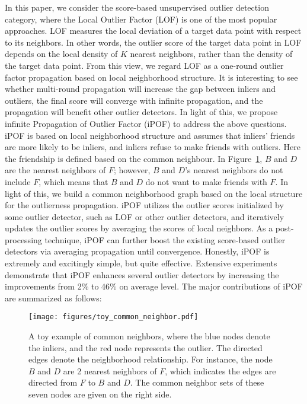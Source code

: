 \documentclass[sigconf,nonacm]{acmart}
\begin{document}
In this paper, we consider the score-based unsupervised outlier detection category, where the Local Outlier Factor (LOF) is one of the most popular approaches. LOF measures the local deviation of a target data point with respect to its neighbors. In other words, the outlier score of the target data point in LOF depends on the local density of $K$ nearest neighbors, rather than the density of the target data point. From this view, we regard LOF as a one-round outlier factor propagation based on local neighborhood structure. It is interesting to see whether multi-round propagation will increase the gap between inliers and outliers, the final score will converge with infinite propagation, and the propagation will benefit other outlier detectors. In light of this, we propose infinite Propagation of Outlier Factor (iPOF) to address the above questions. iPOF is based on local neighborhood structure and assumes that inliers' friends are more likely to be inliers, and inliers refuse to make friends with outliers. Here the friendship is defined based on the common neighbour. In Figure\textcolor{red}{~\ref{fig:neighbor}}, $B$ and $D$ are the nearest neighbors of $F$; however, $B$ and $D$'s nearest neighbors do not include $F$, which means that $B$ and $D$ do not want to make friends with $F$. In light of this, we build a common neighborhood graph based on the local structure for the outlierness propagation. iPOF utilizes the outlier scores initialized by some outlier detector, such as LOF or other outlier detectors, and iteratively updates the outlier scores by averaging the scores of local neighbors. As a post-processing technique, iPOF can further boost the existing score-based outlier detectors via averaging propagation until convergence. Honestly, iPOF is extremely and excitingly simple, but quite effective. Extensive experiments demonstrate that iPOF enhances several outlier detectors by increasing the improvements from 2\% to 46\% on average level. The major contributions of iPOF are summarized as follows:

\begin{figure}[t]
  \centering
    \texttt{[image: figures/toy\_common\_neighbor.pdf]}
  \caption{A toy example of common neighbors, where the blue nodes denote the inliers, and the red node represents the outlier. The directed edges denote the neighborhood relationship. For instance, the node $B$ and $D$ are 2 nearest neighbors of $F$, which indicates the edges are directed from $F$ to $B$ and $D$. The common neighbor sets of these seven nodes are given on the right side. } \label{fig:neighbor}\vspace{-4mm}
\end{figure}
\end{document}
